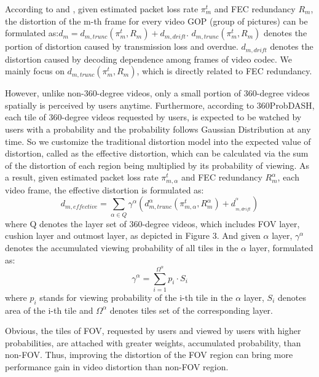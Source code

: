 According to \cite{distortion_model} and \cite{CMT-VR}, given estimated packet loss rate $\pi _{m}^t$ and FEC redundancy $R_m$,
the distortion of the m-th frame for every video GOP (group of pictures) can be formulated as:${d_m} = d_{m,trunc}(\pi _{m}^t, R_m) + {d_{m,drift}}$. $d_{m,trunc}(\pi _{m}^t, R_m)$ denotes the portion of distortion caused by transmission loss and overdue. ${d_{m,drift}}$ denotes the distortion caused by decoding dependence among frames of video codec. We mainly focus on $d_{m,trunc}(\pi _{m}^t, R_m)$, which is directly related to FEC redundancy.

However, unlike non-360-degree videos, only a small portion of 360-degree videos spatially is perceived by users anytime. Furthermore, according to 360ProbDASH\cite{360ProbDASH}, each tile of 360-degree videos requested by users, is expected to be watched by users with a probability and the probability follows Gaussian Distribution at any time. So we customize the traditional distortion model into the expected value of distortion, called as the effective distortion, which can be calculated via the sum of the distortion of each region being multiplied by its probability of viewing. 
As a result, given estimated packet loss rate $\pi _{m,\alpha }^t$ and FEC redundancy $R_m^\alpha$, each video frame, the effective distortion is formulated as:
\begin{equation}
{d_{m,effective}} = \sum\limits_{\alpha  \in Q} {{\gamma ^\alpha }(d_{m,trunc}^\alpha (\pi _{m,\alpha }^t, R_m^\alpha) + d_{_{m,drift}}^{^\alpha })}
\end{equation}
where Q denotes the layer set of 360-degree videos, which includes FOV layer, cushion layer and outmost layer, as depicted in Figure 3. And given $\alpha $
layer, ${\gamma ^\alpha }$ denotes the accumulated viewing probability of all tiles in the $\alpha$ layer, formulated as:
\begin{equation}
{\gamma ^\alpha } = \sum\limits_{i = 1}^{{\Omega ^\alpha }} {{p_i} \cdot
	{S_i}}
\end{equation}
where ${p_i}$ stands for viewing probability of the i-th tile in the $\alpha $
layer, ${S_i}$ denotes area of the i-th tile and
${\Omega ^\alpha }$ denotes tiles set of the corresponding layer. 

Obvious, the tiles of FOV, requested by users and viewed by users with higher probabilities, are attached with greater weights, \ie accumulated probability, than non-FOV. Thus, improving the distortion of the FOV region can bring more performance gain in video distortion than non-FOV region. 

